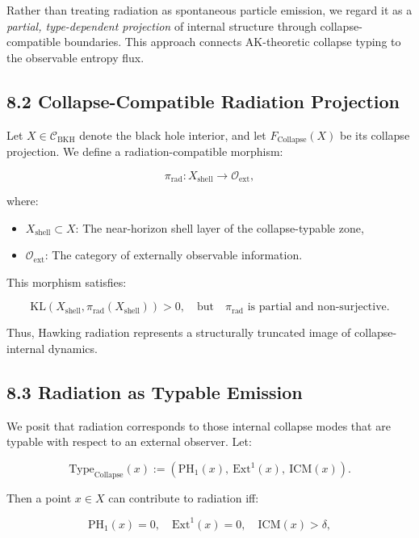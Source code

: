 \documentclass[11pt]{article}
\begin{document}
Rather than treating radiation as spontaneous particle emission, we regard it as a \emph{partial, type-dependent projection} of internal structure through collapse-compatible boundaries. This approach connects AK-theoretic collapse typing to the observable entropy flux.

\subsection*{8.2 Collapse-Compatible Radiation Projection}

Let \( X \in \mathcal{C}_{\mathrm{BKH}} \) denote the black hole interior, and let \( F_{\mathrm{Collapse}}(X) \) be its collapse projection. We define a radiation-compatible morphism:

\[
\pi_{\mathrm{rad}} : X_{\mathrm{shell}} \longrightarrow \mathcal{O}_{\mathrm{ext}},
\]

where:

\begin{itemize}
    \item \( X_{\mathrm{shell}} \subset X \): The near-horizon shell layer of the collapse-typable zone,
    \item \( \mathcal{O}_{\mathrm{ext}} \): The category of externally observable information.
\end{itemize}

This morphism satisfies:

\[
\mathrm{KL}(X_{\mathrm{shell}}, \pi_{\mathrm{rad}}(X_{\mathrm{shell}})) > 0,
\quad \text{but} \quad
\pi_{\mathrm{rad}} \text{ is partial and non-surjective}.
\]

Thus, Hawking radiation represents a structurally truncated image of collapse-internal dynamics.

\subsection*{8.3 Radiation as Typable Emission}

We posit that radiation corresponds to those internal collapse modes that are typable with respect to an external observer. Let:

\[
\mathrm{Type}_{\mathrm{Collapse}}(x) := \left( \mathrm{PH}_1(x),\ \mathrm{Ext}^1(x),\ \mathrm{ICM}(x) \right).
\]

Then a point \( x \in X \) can contribute to radiation iff:

\[
\mathrm{PH}_1(x) = 0,\quad \mathrm{Ext}^1(x) = 0,\quad \mathrm{ICM}(x) > \delta,
\]
\end{document}
